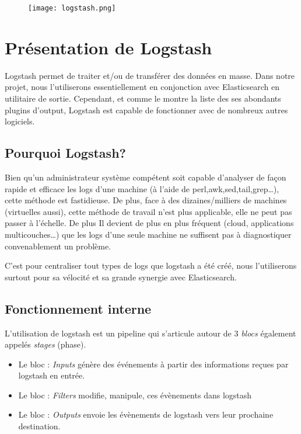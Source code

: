 \begin{figure}[H]
\center
\texttt{[image: logstash.png]}
\label{fig:logstashlogo.png}
\end{figure}
\section{Présentation de Logstash}

Logstash permet de traiter et/ou de transférer des données en masse. Dans notre 
projet, nous l'utiliserons essentiellement en conjonction avec Elasticsearch en 
utilitaire de sortie. Cependant,
et comme le montre la liste des ses abondants plugins d'output, Logstash est capable
de fonctionner avec de nombreux autres logiciels.

\subsection{Pourquoi Logstash?}
Bien qu'un administrateur système compétent soit capable d'analyser de façon rapide 
et efficace les logs d'une machine (à l'aide de perl,awk,sed,tail,grep\ldots), cette méthode
est fastidieuse. De plus, face à des dizaines/milliers de machines (virtuelles aussi), 
cette méthode de travail n'est plus applicable, elle ne peut pas passer à l'échelle.
De plus Il devient de plus en plus fréquent (cloud, applications multicouches\ldots) 
que les logs d'une seule machine ne suffisent pas à diagnostiquer convenablement un 
problème.

C'est pour centraliser tout types de \gls{logs} que logstash a été créé, nous
l'utiliserons surtout pour sa vélocité et sa grande synergie avec Elasticsearch.

\subsection{Fonctionnement interne}
L'utilisation de logstash est un pipeline qui s'articule autour de 3 \emph{blocs} 
également appelés \emph{stages} (phase).
\begin{itemize}
    \item   Le bloc : \emph{Inputs} génère des événements à partir des informations reçues
    par logstash en entrée.
    \item   Le bloc : \emph{Filters} modifie, manipule, ces évènements dans logstash
    \item   Le bloc : \emph{Outputs} envoie les évènements de logstash vers leur 
    prochaine destination.
\end{itemize}

